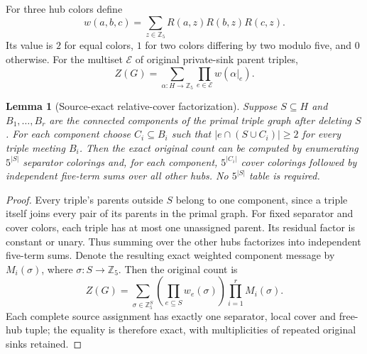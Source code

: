 \documentclass[11pt]{article}
\newtheorem{lemma}{Lemma}
\begin{document}
For three hub colors define
\[
w(a,b,c)=\sum_{z\in\mathbb Z_5}R(a,z)R(b,z)R(c,z).
\]
Its value is $2$ for equal colors, $1$ for two colors differing by
two modulo five, and $0$ otherwise. For the multiset $\mathcal E$
of original private-sink parent triples,
\[
Z(G)=\sum_{\alpha:H\to\mathbb Z_5}\prod_{e\in\mathcal E}w(\alpha|_e).
\]

\begin{lemma}[Source-exact relative-cover factorization]
Suppose $S\subseteq H$ and $B_1,\ldots,B_r$ are the connected
components of the primal triple graph after deleting $S$.
For each component choose $C_i\subseteq B_i$ such that
$|e\cap(S\cup C_i)|\ge2$ for every triple meeting $B_i$.
Then the exact original count can be computed by enumerating
$5^{|S|}$ separator colorings and, for each component,
$5^{|C_i|}$ cover colorings followed by independent five-term
sums over all other hubs. No $5^{|S|}$ table is required.
\end{lemma}
\begin{proof}
Every triple's parents outside $S$ belong to one component, since
a triple itself joins every pair of its parents in the primal graph.
For fixed separator and cover colors, each triple has at most
one unassigned parent. Its residual factor is constant or unary.
Thus summing over the other hubs factorizes into independent
five-term sums. Denote the resulting exact weighted component
message by $M_i(\sigma)$, where $\sigma:S\to\mathbb Z_5$.
Then the original count is
\[
Z(G)=\sum_{\sigma\in\mathbb Z_5^S}
\left(\prod_{e\subseteq S}w_e(\sigma)\right)
\prod_{i=1}^rM_i(\sigma).
\]
Each complete source assignment has exactly one separator, local
cover and free-hub tuple; the equality is therefore exact, with
multiplicities of repeated original sinks retained.
\end{proof}
\end{document}
